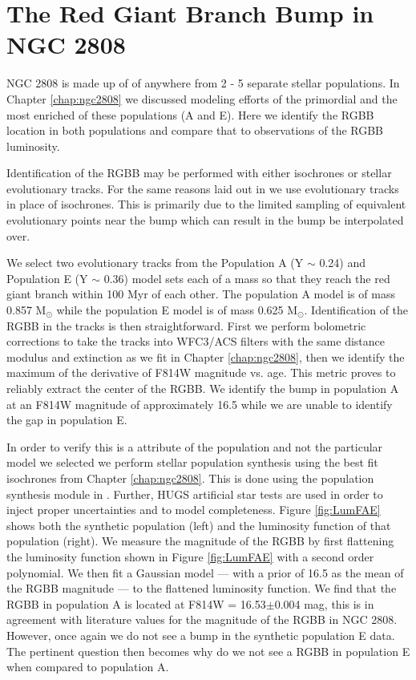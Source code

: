 \section{The Red Giant Branch Bump in NGC 2808}
NGC 2808 is made up of of anywhere from 2 - 5 separate stellar populations. In
Chapter \ref{chap:ngc2808} we discussed modeling efforts of the primordial
and the most enriched of these populations (A and E). Here we identify the
RGBB location in both populations and compare that to observations of the RGBB
luminosity.

Identification of the RGBB may be performed with either isochrones or stellar
evolutionary tracks. For the same reasons laid out in \citet{Joyce2016} we use
evolutionary tracks in place of isochrones. This is primarily due to the
limited sampling of equivalent evolutionary points near the bump which can
result in the bump be interpolated over. 

We select two evolutionary tracks from the Population A (Y $\sim$ 0.24) and
Population E (Y $\sim$ 0.36) model sets each of a mass so that they reach the
red giant branch within 100 Myr of each other. The population A model is of
mass 0.857 M$_{\odot}$ while the population E model is of mass 0.625
M$_{\odot}$. Identification of the RGBB in the tracks is then straightforward.
First we perform bolometric corrections to take the tracks into WFC3/ACS
filters with the same distance modulus and extinction as we fit in Chapter
\ref{chap:ngc2808}, then we identify the maximum of the derivative of F814W
magnitude vs. age. This metric proves to reliably extract the center of the
RGBB. We identify the bump in population A at an F814W magnitude of approximately 16.5 while
we are unable to identify the gap in population E.

In order to verify this is a attribute of the population and not the particular
model we selected we perform stellar population synthesis using the best fit
isochrones from Chapter \ref{chap:ngc2808}. This is done using the population
synthesis module in \fidanka. Further, HUGS artificial star tests are used in
order to inject proper uncertainties and to model completeness. Figure
\ref{fig:LumFAE} shows both the synthetic population (left) and the luminosity
function of that population (right). We measure the magnitude of the RGBB by
first flattening the luminosity function shown in Figure \ref{fig:LumFAE} with
a second order polynomial. We then fit a Gaussian model --- with a prior of
16.5 as the mean of the RGBB magnitude --- to the flattened luminosity function.
We find that the RGBB in population A is located at F814W = 16.53$\pm$0.004
mag, this is in agreement with literature values for the magnitude of the RGBB
in NGC 2808. However, once again we do not see a bump in the synthetic
population E data. The pertinent question then becomes why do we not see a
RGBB in population E when compared to population A.

